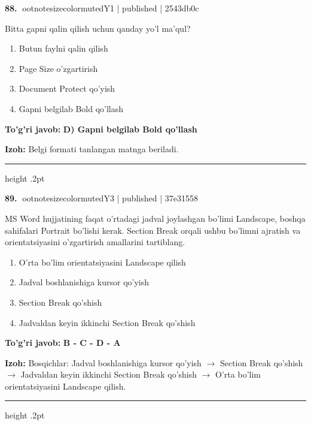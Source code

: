 \documentclass[10pt,a4paper]{article}
\begin{document}
\textbf{\color{ink}88.} {ootnotesizecolor{muted}Y1 | published | 2543db0c}
\par
Bitta gapni qalin qilish uchun qanday yo'l ma'qul?
\begin{enumerate}[label=\Alph*),leftmargin=9mm]
\item Butun faylni qalin qilish
\item Page Size o'zgartirish
\item Document Protect qo'yish
\item Gapni belgilab Bold qo'llash
\end{enumerate}
\begin{tcolorbox}[enhanced,breakable,colback=teal!4,colframe=teal!55!black,boxrule=0.45pt,arc=1.2mm,left=2.8mm,right=2.8mm,top=2mm,bottom=2mm]
\textbf{\color{teal}To'g'ri javob:} \textbf{D) Gapni belgilab Bold qo'llash}
\par\smallskip
\textbf{Izoh:} Belgi formati tanlangan matnga beriladi.
\end{tcolorbox}
\vspace{2mm}\hrule height .2pt\vspace{2mm}

\textbf{\color{ink}89.} {ootnotesizecolor{muted}Y3 | published | 37e31558}
\par
MS Word hujjatining faqat o'rtadagi jadval joylashgan bo'limi Landscape, boshqa sahifalari Portrait bo'lishi kerak. Section Break orqali ushbu bo'limni ajratish va orientatsiyasini o'zgartirish amallarini tartiblang.
\begin{enumerate}[label=\Alph*),leftmargin=9mm]
\item O'rta bo'lim orientatsiyasini Landscape qilish
\item Jadval boshlanishiga kursor qo'yish
\item Section Break qo'shish
\item Jadvaldan keyin ikkinchi Section Break qo'shish
\end{enumerate}
\begin{tcolorbox}[enhanced,breakable,colback=teal!4,colframe=teal!55!black,boxrule=0.45pt,arc=1.2mm,left=2.8mm,right=2.8mm,top=2mm,bottom=2mm]
\textbf{\color{teal}To'g'ri javob:} \textbf{B - C - D - A}
\par\smallskip
\textbf{Izoh:} Bosqichlar: Jadval boshlanishiga kursor qo'yish \ensuremath{\rightarrow} Section Break qo'shish \ensuremath{\rightarrow} Jadvaldan keyin ikkinchi Section Break qo'shish \ensuremath{\rightarrow} O'rta bo'lim orientatsiyasini Landscape qilish.
\end{tcolorbox}
\vspace{2mm}\hrule height .2pt\vspace{2mm}
\end{document}

